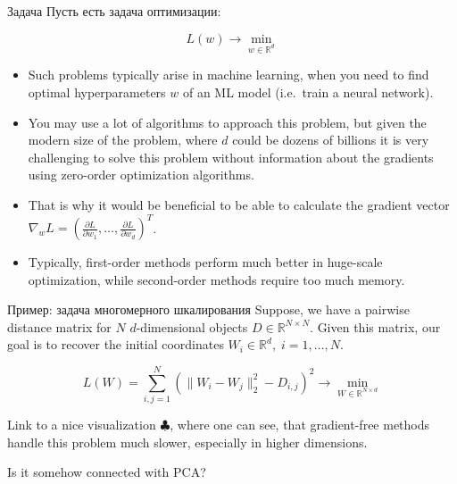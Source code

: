 \documentclass[
  9pt,
  ignorenonframetext,
  aspectratio=169,
]{beamer}
\providecommand{\tightlist}{%
  \setlength{\itemsep}{0pt}\setlength{\parskip}{0pt}}
\begin{document}
\begin{frame}{Задача}
\label{ux437ux430ux434ux430ux447ux430}
Пусть есть задача оптимизации:

\[
L(w) \to \min_{w \in \mathbb{R}^d}
\]

\pause

\begin{itemize}[<+->]
\tightlist
\item
  Such problems typically arise in machine learning, when you need to
  find optimal hyperparameters \(w\) of an ML model (i.e.~train a neural
  network).
\item
  You may use a lot of algorithms to approach this problem, but given
  the modern size of the problem, where \(d\) could be dozens of
  billions it is very challenging to solve this problem without
  information about the gradients using zero-order optimization
  algorithms.
\item
  That is why it would be beneficial to be able to calculate the
  gradient vector
  \(\nabla_w L = \left( \frac{\partial L}{\partial w_1}, \ldots, \frac{\partial L}{\partial w_d}\right)^T\).
\item
  Typically, first-order methods perform much better in huge-scale
  optimization, while second-order methods require too much memory.
\end{itemize}
\end{frame}

\begin{frame}{Пример: задача многомерного шкалирования}
\label{ux43fux440ux438ux43cux435ux440-ux437ux430ux434ux430ux447ux430-ux43cux43dux43eux433ux43eux43cux435ux440ux43dux43eux433ux43e-ux448ux43aux430ux43bux438ux440ux43eux432ux430ux43dux438ux44f}
Suppose, we have a pairwise distance matrix for \(N\) \(d\)-dimensional
objects \(D \in \mathbb{R}^{N \times N}\). Given this matrix, our goal
is to recover the initial coordinates
\(W_i \in \mathbb{R}^d, \; i = 1, \ldots, N\).

\pause

\[
L(W) = \sum_{i, j = 1}^N \left(\|W_i - W_j\|^2_2 - D_{i,j}\right)^2 \to \min_{W \in \mathbb{R}^{N \times d}}
\]

\pause

Link to a nice visualization
\href{http://www.benfrederickson.com/numerical-optimization/}{\(\clubsuit\)},
where one can see, that gradient-free methods handle this problem much
slower, especially in higher dimensions.

\begin{tcolorbox}[enhanced jigsaw, bottomrule=.15mm, title=\textcolor{quarto-callout-color}{\faInfo}\hspace{0.5em}{Question}, breakable, opacitybacktitle=0.6, colbacktitle=quarto-callout-color!10!white, left=2mm, bottomtitle=1mm, colback=white, colframe=quarto-callout-color-frame, titlerule=0mm, toptitle=1mm, arc=.35mm, rightrule=.15mm, coltitle=black, toprule=.15mm, opacityback=0, leftrule=.75mm]

Is it somehow connected with PCA?

\end{tcolorbox}
\end{frame}
\end{document}
